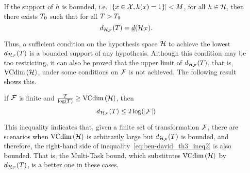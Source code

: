 \begin{theorem}
    If the support of $h$ is bounded, i.e. $ \left|\left\{x \in \mathcal{X},  h(x) = 1\right\}\right| < M$, for all $h \in \mathcal{H}$, then there exists $T_0$ such that for all $T>T_0$
    \begin{equation}
        \nonumber
        d_{\mathcal{H}_{\mathcal{F}}}(T) = \underline{d}(\mathcal{H}_{\mathcal{F}}).
    \end{equation} 
\end{theorem}
Thus, a sufficient condition on the hypothesis space $\mathcal{H}$ to achieve the lowest $d_{\mathcal{H}_{\mathcal{F}}}(T)$ is a bounded support of any hypothesis. Although this condition may be too restricting, it can also be proved that the upper limit of $d_{\mathcal{H}_{\mathcal{F}}}(T)$, that is, $\text{VCdim}\left(\mathcal{H}\right)$, under some conditions on $\mathcal{F}$ is not achieved. 
%
The following result~\cite[Theorem~6]{Ben-DavidB08} shows this.
\begin{theorem}\label{th:ben-david_th6}
    If $\mathcal{F}$ is finite and $\frac{T}{\log (T)} \geq \text{VCdim}\left(\mathcal{H}\right)$, then
    \begin{equation}
        \nonumber
        d_{\mathcal{H}_{\mathcal{F}}}(T) \leq 2 \log(\left|\mathcal{F}\right|)
    \end{equation}
\end{theorem}
This inequality indicates that, given a finite set of transformation $\mathcal{F}$, there are scenarios when $\text{VCdim}\left(\mathcal{H}\right)$ is arbitrarily large but $d_{\mathcal{H}_{\mathcal{F}}}(T)$ is bounded, and therefore, the right-hand side of inequality~\eqref{eq:ben-david_th3_ineq2} is also bounded. That is, the Multi-Task bound, which substitutes $\text{VCdim}\left(\mathcal{H}\right)$ by $d_{\mathcal{H}_{\mathcal{F}}}(T)$, is a better one in these cases. 



